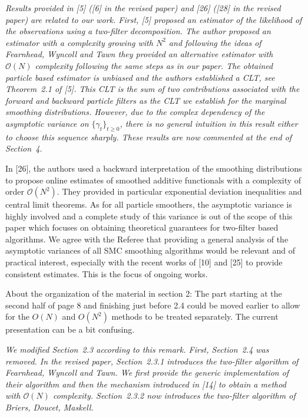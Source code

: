 \documentclass{article}
\begin{document}
{\em
Results provided in [5] ([6] in the revised paper) and [26] ([28] in the revised paper) are related to our work. First, [5] proposed an estimator of the likelihood of the observations using a two-filter decomposition. The author proposed an estimator with a complexity growing with $N^2$ and following the ideas of Fearnhead, Wyncoll and Tawn they provided an alternative estimator with $\mathcal{O}(N)$ complexity following the same steps as in our paper. The obtained particle based estimator is unbiased and the authors established a CLT, see Theorem~2.1 of [5]. This CLT is the sum of two contributions associated with the forward and backward particle filters as the CLT we establish for the marginal smoothing distributions. However, due to the complex dependency of the asymptotic variance on $\{\gamma_t\}_{t\ge 0}$, there is no general intuition in this result either to choose this sequence sharply. These results are now commented at the end of Section~4.

In [26], the authors used a backward interpretation of the smoothing distributions to propose online estimates of smoothed additive functionals with a complexity of order $\mathcal{O}(N^2)$. They provided in particular exponential deviation inequalities and central limit theorems. As for all particle smoothers, the asymptotic variance is highly involved and a complete study of this variance is out of the scope of this paper which focuses on obtaining theoretical guarantees for two-filter based algorithms. We agree with the Referee that providing a general analysis of the asymptotic variances of all SMC smoothing algorithms would be relevant and of practical interest, especially with the recent works of [10] and [25] to provide consistent estimates. This is the focus of ongoing works.
}


\vspace{1cm}

About the organization of the material in section 2: The part starting
at the second half of page 8 and finishing just before 2.4 could be moved
earlier to allow for the $O(N)$ and $O(N^2)$ methods to be treated separately.
The current presentation can be a bit confusing.

\vspace{.5cm}

{\em
We modified Section~2.3 according to this remark. First, Section~2.4 was removed. In the revised paper, Section~2.3.1 introduces the two-filter algorithm of Fearnhead, Wyncoll and Tawn. We first provide the generic implementation of their algorithm and then the mechanism introduced in [14] to obtain a method with $\mathcal{O}(N)$ complexity. Section~2.3.2
now introduces the two-filter algorithm of Briers, Doucet, Maskell.}
\end{document}

